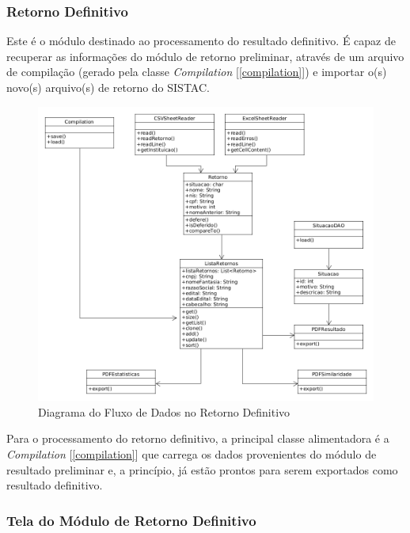 \documentclass[
	12pt,			%
	openright,		%
	oneside,	
	a4paper,		%
	english,		%
	brazil			%
]{abntex2/abntex2}  %
\begin{document}
				\subsubsection{Retorno Definitivo} \label{retorno-definitivo}
	
					Este é o módulo destinado ao processamento do resultado definitivo. É capaz de recuperar as informações do módulo de retorno preliminar, através de um arquivo de compilação (gerado pela classe \textit{Compilation} [\ref{compilation}]) e importar o(s) novo(s) arquivo(s) de retorno do SISTAC.

					\begin{figure}[ht]
						\begin{center}
							
							\caption{Diagrama do Fluxo de Dados no Retorno Definitivo}
							\includegraphics[scale=0.5]{img/retorno-def-uml}
							
						\end{center}
					\end{figure}
	
					Para o processamento do retorno definitivo, a principal classe alimentadora é a \textit{Compilation} [\ref{compilation}] que carrega os dados provenientes do módulo de resultado preliminar e, a princípio, já estão prontos para serem exportados como resultado definitivo.
	
				\subsubsection{Tela do Módulo de Retorno Definitivo}
	
\end{document}
